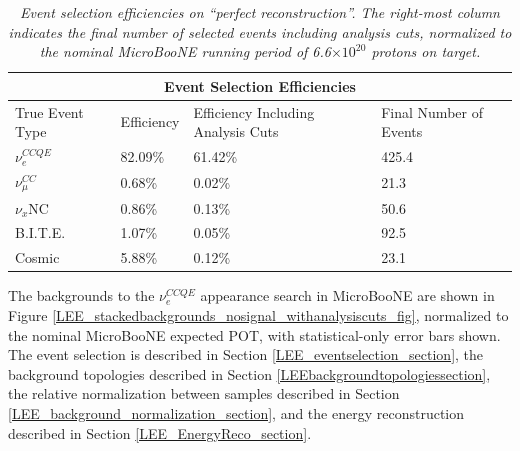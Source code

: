 \begin{table}
\begin{tabular}{ |p{3 cm}|p{2 cm}|p{3.5 cm}|p{4 cm}|  }
 \hline
 \multicolumn{4}{|c|}{Event Selection Efficiencies} \\
 \hline
 True Event Type & Efficiency & Efficiency Including Analysis Cuts & Final Number of Events \\
 \hline \hline
 $\nu_e^{CCQE}$ & 82.09\% & 61.42\% & 425.4\\\hline
 
 $\nu_\mu^{CC}$ & 0.68\% & 0.02\% & 21.3\\\hline

 $\nu_x$NC & 0.86\% & 0.13\% & 50.6\\\hline

 B.I.T.E. & 1.07\% & 0.05\% & 92.5\\\hline

 Cosmic & 5.88\% & 0.12\% & 23.1\\\hline

 \hline
\end{tabular}
\caption{\textit{Event selection efficiencies on ``perfect reconstruction''. The right-most column indicates the final number of selected events including analysis cuts, normalized to the nominal MicroBooNE running period of 6.6$\times10^{20}$ protons on target.}}\label{eventselection_efficiency_table}
\end{table}



The backgrounds to the $\nu_e^{CCQE}$ appearance search in MicroBooNE are shown in Figure \ref{LEE_stackedbackgrounds_nosignal_withanalysiscuts_fig}, normalized to the nominal MicroBooNE expected POT, with statistical-only error bars shown. The event selection is described in Section \ref{LEE_eventselection_section}, the background topologies described in Section \ref{LEEbackgroundtopologiessection}, the relative normalization between samples described in Section \ref{LEE_background_normalization_section}, and the energy reconstruction described in Section \ref{LEE_EnergyReco_section}.


